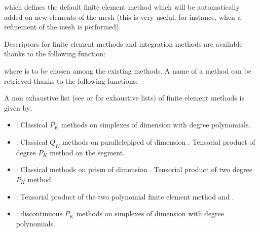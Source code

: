 \documentclass[a4paper,11pt,english]{sphinxmanual}
\begin{document}
which defines the default finite element method which will be automatically added
on new elements of the mesh (this is very useful, for instance, when a refinement
of the mesh is performed).

Descriptors for finite element methods and integration methods are available
thanks to the following function:

\begin{sphinxVerbatim}[commandchars=\\\{\}]
   
\end{sphinxVerbatim}

where  is to be chosen among the existing methods. A name of a
method can be retrieved thanks to the following functions:

\begin{sphinxVerbatim}[commandchars=\\\{\}]
   
\end{sphinxVerbatim}

A non exhaustive list (see {\hyperref[\detokenize{userdoc/appendixA:ud-appendixa}]{}} or  for
exhaustive lists) of finite element methods is given by:
\begin{itemize}
\item {} 
: Classical \(P_K\) methods on simplexes of dimension 
with degree  polynomials.

\item {} 
: Classical \(Q_K\) methods on parallelepiped of dimension
. Tensorial product of degree  \(P_K\) method on the segment.

\item {} 
: Classical methods on prism of dimension .
Tensorial product of two degree  \(P_K\) method.

\item {} 
: Tensorial product of the two polynomial finite element
method  and .

\item {} 
: discontinuous \(P_K\) methods on simplexes
of dimension  with degree  polynomials.

\end{itemize}
\end{document}
